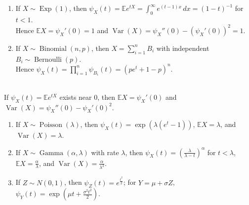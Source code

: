 \begin{example} \label{ex:mgf-computations} 
\begin{enumerate}[label=(\roman*)]
\setlength{\itemsep}{0pt}
\item If $X\sim\operatorname{Exp}(1)$, then $\psi_X(t)=\mathbb{E}e^{tX}=\int_{0}^{\infty}e^{(t-1)x}\,dx=(1-t)^{-1}$ for $t<1$.\\
Hence $\mathbb{E}X=\psi_X'(0)=1$ and $\operatorname{Var}(X)=\psi_X''(0)-(\psi_X'(0))^2=1$.
\item If $X\sim\operatorname{Binomial}(n,p)$, then $X=\sum\limits_{i=1}^{n}B_i$ with independent $B_i\sim\operatorname{Bernoulli}(p)$.\\
Hence $\psi_X(t)=\prod\limits_{i=1}^{n}\psi_{B_i}(t)=(pe^t+1-p)^n$.
\end{enumerate}
\end{example}

\begin{method} \label{meth:mgf-calculus-for-classical-laws} \\
If $\psi_X(t)=\mathbb{E}e^{tX}$ exists near $0$, then $\mathbb{E}X=\psi_X'(0)$ and $\operatorname{Var}(X)=\psi_X''(0)-\psi_X'(0)^2$.
\begin{enumerate}[label=(\roman*)]
\setlength{\itemsep}{0pt}
\item If $X\sim\operatorname{Poisson}(\lambda)$, then $\psi_X(t)=\exp(\lambda(e^t-1))$, $\mathbb{E}X=\lambda$, and $\operatorname{Var}(X)=\lambda$.
\item If $X\sim\operatorname{Gamma}(\alpha,\lambda)$ with rate $\lambda$, then $\psi_X(t)=(\frac{\lambda}{\lambda-t})^\alpha$ for $t<\lambda$, $\mathbb{E}X=\frac{\alpha}{\lambda}$, and $\operatorname{Var}(X)=\frac{\alpha}{\lambda^2}$.
\item If $Z\sim N(0,1)$, then $\psi_Z(t)=e^{\frac{t^2}{2}}$; for $Y=\mu+\sigma Z$, $\psi_Y(t)=\exp(\mu t+\frac{\sigma^2t^2}{2})$.
\end{enumerate}
\end{method}

